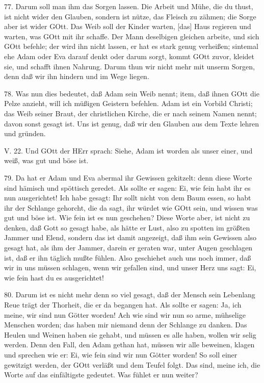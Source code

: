 77. Darum soll man ihm das Sorgen lassen. Die Arbeit und Mühe, die du thust, ist nicht wider den Glauben, sondern ist nütze, das Fleisch zu zähmen; die Sorge aber ist wider GOtt. Das Weib soll der Kinder warten, [das] Haus regieren und warten, was GOtt mit ihr schaffe. Der Mann deselbigen gleichen arbeite, und sich GOtt befehle; der wird ihn nicht lassen, er hat es stark genug verheißen; sintemal ehe Adam oder Eva darauf denkt oder darum sorgt, kommt GOtt zuvor, kleidet sie, und schafft ihnen Nahrung. Darum thun wir nicht mehr mit unserm Sorgen, denn daß wir ihn hindern und im Wege liegen.

78. Was nun dies bedeutet, daß Adam sein Weib nennt; item, daß ihnen GOtt die Pelze anzieht, will ich müßigen Geistern befehlen. Adam ist ein Vorbild Christi; das Weib seiner Braut, der christlichen Kirche, die er nach seinem Namen nennt; davon sonst gesagt ist. Uns ist genug, daß wir den Glauben aus dem Texte lehren und gründen.

\begin{schriftzitat}
V. 22. Und GOtt der HErr sprach: Siehe, Adam ist worden als unser einer, und weiß, was gut und böse ist.
\end{schriftzitat}

79. Da hat er Adam und Eva abermal ihr Gewissen gekitzelt: denn diese Worte sind hämisch und spöttisch geredet. Als sollte er sagen: Ei, wie fein habt ihr es nun ausgerichtet! Ich habe gesagt: Ihr sollt nicht von dem Baum essen, so habt ihr der Schlange gehorcht, die da sagt, ihr würdet wie GOtt sein, und wissen was gut und böse ist. Wie fein ist es nun geschehen? Diese Worte aber, ist nicht zu denken, daß Gott so gesagt habe, als hätte er Lust, also zu spotten im größten Jammer und Elend, sondern das ist damit angezeigt, daß ihm sein Gewissen also gesagt hat, als ihm der Jammer, darein er geraten war, unter Augen geschlagen ist, daß er ihn täglich mußte fühlen. Also geschiehet auch uns noch immer, daß wir in uns müssen schlagen, wenn wir gefallen sind, und unser Herz uns sagt: Ei, wie fein hast du es ausgerichtet!

80. Darum ist es nicht mehr denn so viel gesagt, daß der Mensch sein Lebenlang Reue trägt der Thorheit, die er da begangen hat. Als sollte er sagen: Ja, ich meine, wir sind nun Götter worden! Ach wie sind wir nun so arme, mühselige Menschen worden; das haben mir niemand denn der Schlange zu danken. Das Heulen und Weinen haben sie gehabt, und müssen es alle haben, wollen wir selig werden. Denn den Fall, den Adam gethan hat, müssen wir alle beweinen, klagen und sprechen wie er: Ei, wie
fein sind wir nun Götter worden! So soll einer gewitzigt werden, der GOtt verläßt und dem Teufel folgt. Das sind, meine ich, die Worte auf das einfältigste gedeutet. Was fühlet er nun weiter?

